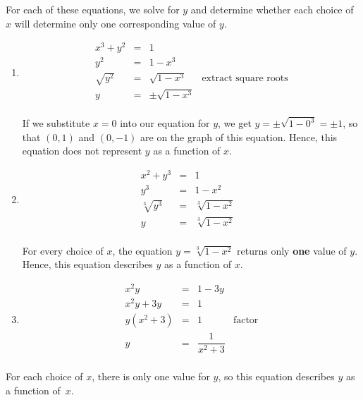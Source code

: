 {
For each of these equations, we solve for $y$ and determine whether each choice of $x$ will determine only one corresponding value of $y$.

\setlength{\extrarowheight}{2pt}

\begin{enumerate}

\item  \[ \begin{array}{rclr} 
         x^3 + y^2 & = & 1 & \\
               y^2 & = & 1 - x^3 & \\
        \sqrt{y^2} & = & \sqrt{1 - x^3} & \mbox{extract square roots} \\
                 y & = & \pm \sqrt{1 - x^3} & \\ 
        \end{array} \]

If we substitute $x=0$ into our equation for $y$, we get  $y = \pm \sqrt{1 - 0^3} = \pm 1$, so that $(0,1)$ and $(0,-1)$ are on the graph of this equation. Hence, this equation does not represent $y$ as a function of $x$.

\item  \[ \begin{array}{rclr} 
          x^2 + y^3 & = & 1 & \\
          y^3 & = & 1 - x^2 & \\
          \sqrt[3]{y^3} & = & \sqrt[3]{1 - x^2} & \\
          y & = & \sqrt[3]{1 - x^2} & \\ 
          \end{array} \]

For every choice of $x$, the equation $y =  \sqrt[3]{1 - x^2}$ returns only \textbf{one} value of $y$.  Hence, this equation describes $y$ as a function of $x$.

\item  \[ \begin{array}{rclr} 
          x^2y & = & 1 - 3y & \\
          x^2y + 3y & = & 1 & \\
          y \left(x^2 + 3\right) & = & 1 & \mbox{factor} \\
          y & = & \dfrac{1}{x^2 + 3} & \\ 
          \end{array} \]


\end{enumerate}

For each choice of $x$, there is only one value for $y$, so this equation describes $y$ as a function of~$x$.
}

